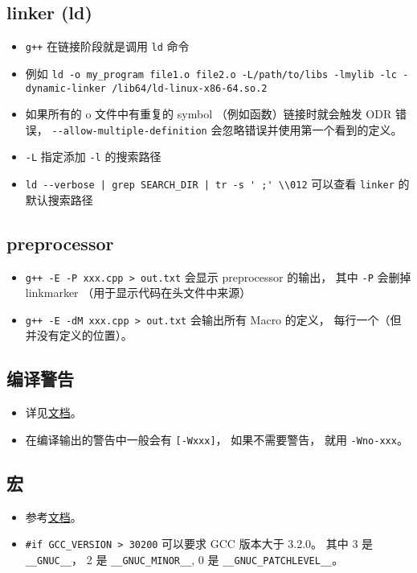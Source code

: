 \subsection{linker (ld)}
\begin{itemize}
\item \verb`g++` 在链接阶段就是调用 \verb`ld` 命令
\item 例如 \verb`ld -o my_program file1.o file2.o -L/path/to/libs -lmylib -lc -dynamic-linker /lib64/ld-linux-x86-64.so.2`
\item 如果所有的 o 文件中有重复的 symbol （例如函数）链接时就会触发 ODR 错误， \verb`--allow-multiple-definition` 会忽略错误并使用第一个看到的定义。
\item \verb`-L` 指定添加 \verb`-l` 的搜索路径
\item \verb`ld --verbose | grep SEARCH_DIR | tr -s ' ;' \\012` 可以查看 \verb`linker` 的默认搜索路径
\end{itemize}

\subsection{preprocessor}
\begin{itemize}
\item \verb`g++ -E -P xxx.cpp > out.txt` 会显示 preprocessor 的输出， 其中 \verb`-P` 会删掉 linkmarker （用于显示代码在头文件中来源）
\item \verb`g++ -E -dM xxx.cpp > out.txt` 会输出所有 Macro 的定义， 每行一个（但并没有定义的位置）。
\end{itemize}

\subsection{编译警告}
\begin{itemize}
\item 详见\href{https://gcc.gnu.org/onlinedocs/gcc/Warning-Options.html}{文档}。
\item 在编译输出的警告中一般会有 \verb`[-Wxxx]`， 如果不需要警告， 就用 \verb`-Wno-xxx`。
\end{itemize}

\subsection{宏}
\begin{itemize}
\item 参考\href{https://gcc.gnu.org/onlinedocs/cpp/Common-Predefined-Macros.html}{文档}。
\item \verb`#if GCC_VERSION > 30200` 可以要求 GCC 版本大于 3.2.0。 其中 3 是 \verb`__GNUC__`， 2 是 \verb`__GNUC_MINOR__`,  0 是 \verb`__GNUC_PATCHLEVEL__`。
\end{itemize}

